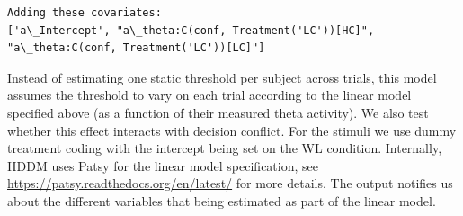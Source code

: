 \documentclass[letterpaper,10pt,english]{sphinxmanual}
\begin{document}
\begin{Verbatim}[commandchars=\\\{\}]
Adding these covariates:
['a\_Intercept', "a\_theta:C(conf, Treatment('LC'))[HC]", "a\_theta:C(conf, Treatment('LC'))[LC]"]
\end{Verbatim}

Instead of estimating one static threshold per subject across trials,
this model assumes the threshold to vary on each trial according to the
linear model specified above (as a function of their measured theta
activity). We also test whether this effect interacts with decision
conflict. For the stimuli we use dummy treatment coding with the
intercept being set on the WL condition. Internally, HDDM uses Patsy for
the linear model specification, see
\href{https://patsy.readthedocs.org/en/latest/}{https://patsy.readthedocs.org/en/latest/} for more details. The output
notifies us about the different variables that being estimated as part
of the linear model.
\end{document}
